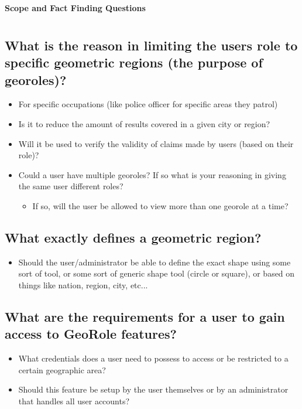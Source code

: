 \documentclass{article}
\begin{document}
\begin{center}
\textbf{\LARGE Scope and Fact Finding Questions}
\end{center}

\section*{}

\subsection*{What is the reason in limiting the users role to specific geometric regions (the purpose of georoles)?}
\begin{itemize}
\item For specific occupations (like police officer for specific areas they patrol)
\item Is it to reduce the amount of results covered in a given city or region?
\item Will it be used to verify the validity of claims made by users (based on their role)?
\item Could a user have multiple georoles? If so what is your reasoning in giving the same user different roles?
\begin{itemize}
\item If so, will the user be allowed to view more than one georole at a time? 
\end{itemize}
\end{itemize}

\subsection*{What exactly defines a geometric region?}
\begin{itemize}
    \item Should the user/administrator be able to define the exact shape using some sort of tool, or some sort of generic shape tool 
    (circle or square), or based on things like nation, region, city, etc...
\end{itemize}

\subsection*{What are the requirements for a user to gain access to GeoRole features?}
\begin{itemize}
\item What credentials does a user need to possess to access or be restricted to a certain geographic area?
\item Should this feature be setup by the user themselves or by an administrator that handles all user accounts?
\end{itemize}
\end{document}
